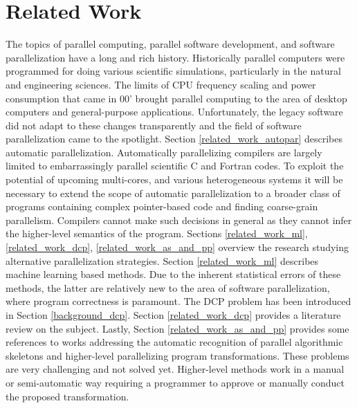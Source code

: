 \chapter{Related Work}
\label{related_work}
\quad The topics of parallel computing, parallel software development, and software parallelization have a long and rich history. Historically parallel computers were programmed for doing various scientific simulations, particularly in the natural and engineering sciences. The limits of CPU frequency scaling and power consumption that came in 00' brought parallel computing to the area of desktop computers and general-purpose applications. Unfortunately, the legacy software did not adapt to these changes transparently and the field of software parallelization came to the spotlight.\newline\null
\quad Section \ref{related_work_autopar} describes automatic parallelization. Automatically parallelizing compilers are largely limited to embarrassingly parallel scientific C and Fortran codes. To exploit the potential of upcoming multi-cores, and various heterogeneous systems it will be necessary to extend the scope of automatic parallelization to a broader class of programs containing complex pointer-based code and finding coarse-grain parallelism. Compilers cannot make such decisions in general as they cannot infer the higher-level semantics of the program. Sections \ref{related_work_ml}, \ref{related_work_dcp}, \ref{related_work_as_and_pp} overview the research studying alternative parallelization strategies. Section \ref{related_work_ml} describes machine learning based methods. Due to the inherent statistical errors of these methods, the latter are relatively new to the area of software parallelization, where program correctness is paramount. The DCP problem has been introduced in Section \ref{background_dcp}. Section \ref{related_work_dcp} provides a literature review on the subject. Lastly, Section \ref{related_work_as_and_pp} provides some references to works addressing the automatic recognition of parallel algorithmic skeletons and higher-level parallelizing program transformations. These problems are very challenging and not solved yet. Higher-level methods work in a manual or semi-automatic way requiring a programmer to approve or manually conduct the proposed transformation.
